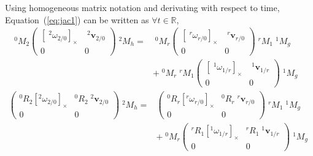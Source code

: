 \documentclass{article}
\newcommand\linvel{\mathbf{v}}
\newcommand\trans{\mathbf{t}}
\newcommand\reals{\mathbb{R}}
\begin{document}
Using homogeneous matrix notation and derivating with respect to time, Equation~(\ref{eq:jac1}) can be written as $\forall t\in\reals$,
\begin{align}\label{eq:jac2}
  ^0M_2
  \left(\begin{array}{ll}[\;^2\omega_{2/0}]_{\times} & \;^2\linvel_{2/0} \\ 0&0\end{array}\right)\;^2M_h =&
    \;^0M_r\left(\begin{array}{ll}[\;^r\omega_{r/0}]_{\times} & \;^r\linvel_{r/0} \\ 0&0\end{array}\right) \;^rM_1\;^1M_g \\
    & + \;^0M_r \;^rM_1\left(\begin{array}{ll}[\;^1\omega_{1/r}]_{\times} & \;^1\linvel_{1/r} \\ 0&0\end{array}\right)\;^1M_g &
\end{align}
\begin{align*}
  \left(\begin{array}{ll}^0R_2[^2\omega_{2/0}]_{\times} & ^0R_2\;^2\linvel_{2/0} \\ 0&0\end{array}\right)\;^2M_h =&
    \left(\begin{array}{ll}^0R_r[^r\omega_{r/0}]_{\times} & ^0R_r\;^r\linvel_{r/0} \\ 0&0\end{array}\right) \;^rM_1\;^1M_g \\
    & + \;^0M_r \left(\begin{array}{ll}^rR_1[^1\omega_{1/r}]_{\times} & ^rR_1\;^1\linvel_{1/r} \\ 0&0\end{array}\right)\;^1M_g &
\end{align*}
\end{document}
